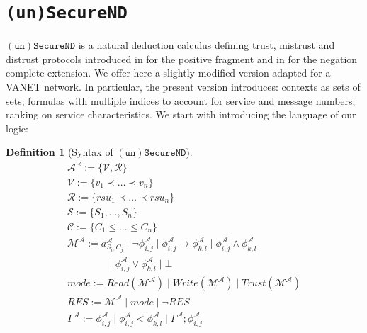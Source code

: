 \documentclass[compsoc, conference, letterpaper, 10pt, times]{IEEEtran}
\newtheorem{definition}{Definition}
\begin{document}
\section{\texttt{(un)SecureND}}\label{sec:logic}

$\mathtt{(un)SecureND}$ is a natural deduction calculus defining trust, mistrust and distrust protocols introduced in \cite{primiero_secureND} for the positive fragment  and in \cite{DBLP:conf/ifiptm/Primiero16} for the negation complete extension. We offer here a slightly modified version adapted for a VANET network. In particular, the present version introduces: contexts as sets of sets; formulas with multiple indices to account for service and message numbers; ranking on service characteristics. We start with introducing the language of our logic:

\begin{definition}[Syntax of $\mathtt{(un)SecureND}$]\label{def:syntax} %
	\begin{displaymath}
	\begin{array}{l}
	\mathcal{A}^{\prec}:= \{\mathcal{V, R}\}\\
	\mathcal{V}:= \{v_{1}\prec \ldots \prec v_{n}\}\\
	\mathcal{R}:= \{rsu_{1}\prec\ldots \prec rsu_{n}\}\\
	\mathcal{S}:= \{S_1, \dots, S_{n}\}\\  %
	\mathcal{C}:= \{C_{1}\leq \dots \leq C_{n}\}\\  %
	\mathcal{M^{\mathcal{A}}}:= a^{\mathcal{A}}_{S_{i},C_{j}}\mid \neg \phi^{\mathcal{A}}_{i,j}\mid \phi^{\mathcal{A}}_{i,j}\rightarrow \phi^{\mathcal{A}}_{k,l}\mid \phi^{\mathcal{A}}_{i,j}\wedge \phi^{\mathcal{A}}_{k,l}\\
	\qquad \qquad \mid \phi^{\mathcal{A}}_{i,j}\vee \phi^{\mathcal{A}}_{k,l} \mid \bot\\
	mode:= Read(\mathcal{M}^{\mathcal{A}})\mid Write(\mathcal{M}^{\mathcal{A}})\mid Trust(\mathcal{M}^{\mathcal{A}})\\
	RES:= \mathcal{M}^{\mathcal{A}}\mid mode\mid \neg RES\\
	\Gamma^{\mathcal{A}}:= 
	\phi^{\mathcal{A}}_{i,j} \mid \phi^{\mathcal{A}}_{i,j} < \phi^{\mathcal{A}}_{k,l} \mid \Gamma^{\mathcal{A}}; \phi^{\mathcal{A}}_{i,j}
	
	\end{array}
	\end{displaymath}
\end{definition}
%
\end{document}
